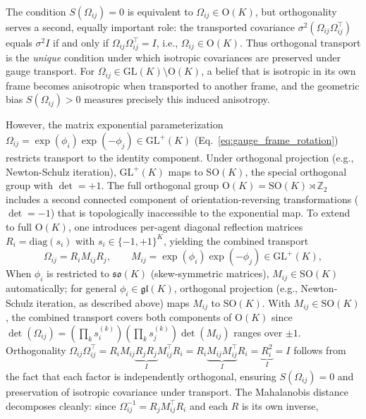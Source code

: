 \documentclass[twoside,11pt]{article}
\begin{document}
The condition $S(\Omega_{ij}) = 0$ is equivalent to $\Omega_{ij} \in \mathrm{O}(K)$, but orthogonality serves a second, equally important role: the transported covariance $\sigma^2(\Omega_{ij}\Omega_{ij}^\top)$ equals $\sigma^2 I$ if and only if $\Omega_{ij}\Omega_{ij}^\top = I$, i.e., $\Omega_{ij} \in \mathrm{O}(K)$. Thus orthogonal transport is the \emph{unique} condition under which isotropic covariances are preserved under gauge transport. For $\Omega_{ij} \in \mathrm{GL}(K) \setminus \mathrm{O}(K)$, a belief that is isotropic in its own frame becomes anisotropic when transported to another frame, and the geometric bias $S(\Omega_{ij}) > 0$ measures precisely this induced anisotropy.

However, the matrix exponential parameterization $\Omega_{ij} = \exp(\phi_i)\exp(-\phi_j) \in \mathrm{GL}^+(K)$ (Eq.~\ref{eq:gauge_frame_rotation}) restricts transport to the identity component. Under orthogonal projection (e.g., Newton-Schulz iteration), $\mathrm{GL}^+(K)$ maps to $\mathrm{SO}(K)$, the special orthogonal group with $\det = +1$. The full orthogonal group $\mathrm{O}(K) = \mathrm{SO}(K) \rtimes \mathbb{Z}_2$ includes a second connected component of orientation-reversing transformations ($\det = -1$) that is topologically inaccessible to the exponential map. To extend to full $\mathrm{O}(K)$, one introduces per-agent diagonal reflection matrices $R_i = \mathrm{diag}(s_i)$ with $s_i \in \{-1,+1\}^K$, yielding the combined transport
%
\begin{equation}
\Omega_{ij} = R_i M_{ij} R_j, \qquad M_{ij} = \exp(\phi_i)\exp(-\phi_j) \in \mathrm{GL}^+(K),
\label{eq:ok_transport}
\end{equation}
%
When $\phi_i$ is restricted to $\mathfrak{so}(K)$ (skew-symmetric matrices), $M_{ij} \in \mathrm{SO}(K)$ automatically; for general $\phi_i \in \mathfrak{gl}(K)$, orthogonal projection (e.g., Newton-Schulz iteration, as described above) maps $M_{ij}$ to $\mathrm{SO}(K)$. With $M_{ij} \in \mathrm{SO}(K)$, the combined transport covers both components of $\mathrm{O}(K)$ since $\det(\Omega_{ij}) = (\prod_k s_i^{(k)})(\prod_k s_j^{(k)})\det(M_{ij})$ ranges over $\pm 1$. Orthogonality $\Omega_{ij}\Omega_{ij}^\top = R_i M_{ij} \underbrace{R_j R_j}_{I} M_{ij}^\top R_i = R_i \underbrace{M_{ij}M_{ij}^\top}_{I} R_i = \underbrace{R_i^2}_{I} = I$ follows from the fact that each factor is independently orthogonal, ensuring $S(\Omega_{ij}) = 0$ and preservation of isotropic covariance under transport. The Mahalanobis distance decomposes cleanly: since $\Omega_{ij}^{-1} = R_j M_{ij}^\top R_i$ and each $R$ is its own inverse,
\end{document}
